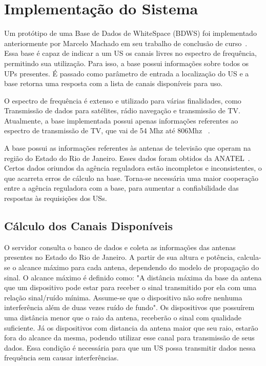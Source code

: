 
\chapter{Implementação do Sistema}

Um protótipo de uma Base de Dados de WhiteSpace (BDWS)
foi implementado anteriormente por Marcelo Machado em seu trabalho de conclusão de curso~\cite{tccmarcelo}. Essa base é capaz de indicar a um US os canais livres no espectro de frequência, permitindo sua utilização. Para isso, a base possui informações sobre todos os UPs presentes. É passado como parâmetro de entrada a localização do US e a base retorna uma resposta com a lista de canais disponíveis para uso.

O espectro de frequência é extenso e utilizado para várias finalidades, como Transmissão de dados para satélites, rádio navegação e transmissão de TV. Atualmente, a base implementada possui apenas informações referentes ao espectro de transmissão de TV, que vai de 54 Mhz até 806Mhz~\cite{fccalloc} .

A base possui as informações referentes às antenas de televisão que operam na região do Estado do Rio de Janeiro. Esses dados foram obtidos da ANATEL~\cite{channelstable}. Certos dados oriundos da agência reguladora estão incompletos e inconsistentes, o que acarreta erros de cálculo na base. Torna-se necessária uma maior cooperação entre a agência reguladora com a base, para aumentar a confiabilidade das respostas às requisições dos USs.

\section{Cálculo dos Canais Disponíveis}

O servidor consulta o banco de dados e coleta as informações das antenas presentes no Estado do Rio de Janeiro. A partir de sua altura e potência, calcula-se o alcance máximo para cada antena, dependendo do modelo de propagação do sinal. O alcance máximo é definido como: "A distância máxima da base da antena que um dispositivo pode estar para receber o sinal transmitido por ela com uma relação sinal/ruído mínima. Assume-se que o dispositivo não sofre nenhuma interferência além de duas vezes ruído de fundo". Os dispositivos que possuírem uma distância menor que o raio da antena, receberão o sinal com qualidade suficiente. Já os dispositivos com distancia da antena maior que seu raio, estarão fora do alcance da mesma, podendo utilizar esse canal para transmissão de seus dados. Essa condição é necessária para que um US possa transmitir dados nessa frequência sem causar interferências.

